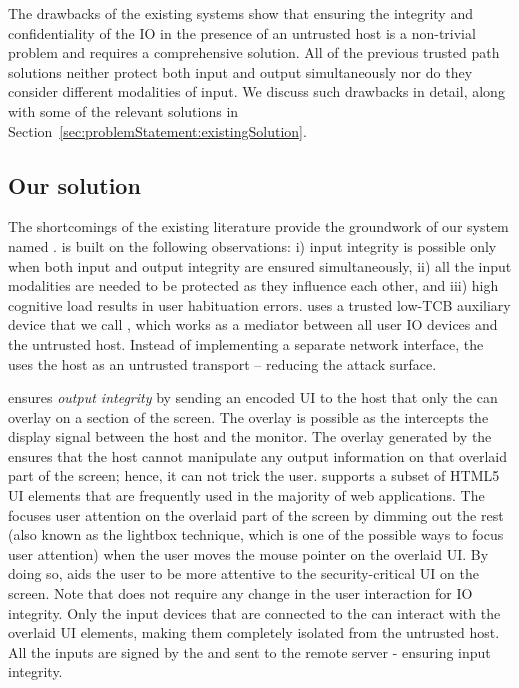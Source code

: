 The drawbacks of the existing systems show that ensuring the integrity and confidentiality of the IO in the presence of an untrusted host is a non-trivial problem and requires a comprehensive solution. All of the previous trusted path solutions neither protect both input and output simultaneously nor do they consider different modalities of input. We discuss such drawbacks in detail, along with some of the relevant solutions in Section~\ref{sec:problemStatement:existingSolution}.

 
\subsection{Our solution} 

The shortcomings of the existing literature provide the groundwork of our system named \name.
\name is built on the following observations: i) input integrity is possible only when both input and output integrity are ensured simultaneously, ii) all the input modalities are needed to be protected as they influence each other, and iii) high cognitive load results in user habituation errors. \name uses a trusted low-TCB auxiliary device that we call \device, which works as a mediator between all user IO devices and the untrusted host. Instead of implementing a separate network interface, the \device uses the host as an untrusted transport -- reducing the attack surface.  

 \name ensures \emph{output integrity} by sending an encoded UI to the host that only the \device can overlay on a section of the screen. The overlay is possible as the \device intercepts the display signal between the host and the monitor. The overlay generated by the \device ensures that the host cannot manipulate any output information on that overlaid part of the screen; hence, it can not trick the user. \device supports a subset of HTML5 UI elements that are frequently used in the majority of web applications. The \device focuses user attention on the overlaid part of the screen by dimming out the rest (also known as the lightbox technique, which is one of the possible ways to focus user attention) when the user moves the mouse pointer on the overlaid UI. By doing so, \name aids the user to be more attentive to the security-critical UI on the screen. Note that \name does not require any change in the user interaction for IO integrity. Only the input devices that are connected to the \device can interact with the overlaid UI elements, making them completely isolated from the untrusted host. All the inputs are signed by the \device and sent to the remote server - ensuring input integrity.

